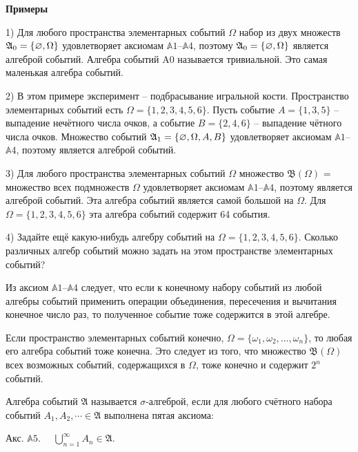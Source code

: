 \textbf{Примеры}

1) Для любого пространства элементарных событий $\Omega$ набор из двух множеств $\mathfrak{A}_0=\{\varnothing,\Omega\}$ удовлетворяет аксиомам $\mathbb{A}1$--$\mathbb{A}4$, поэтому $\mathfrak{A}_0=\{\varnothing,\Omega\}$ является алгеброй событий. Алгебра событий A0 называется тривиальной. Это самая маленькая алгебра событий.

2) В этом примере эксперимент -- подбрасывание игральной кости. Пространство элементарных событий есть $\Omega = \{1, 2, 3, 4, 5, 6\}$. Пусть событие
$A = \{1, 3, 5\}$ -- выпадение нечётного числа очков, а событие $B= \{2, 4, 6\}$
-- выпадение чётного числа очков. 
Множество событий $\mathfrak{A}_1 = \{\varnothing, \Omega, A, B\}$
удовлетворяет аксиомам $\mathbb{A}1$--$\mathbb{A}4$, поэтому является алгеброй событий.

3) Для любого пространства элементарных событий $\Omega$ множество $\mathfrak{B}(\Omega)$ =
множество всех подмножеств $\Omega$ удовлетворяет аксиомам $\mathbb{A}1$--$\mathbb{A}4$, поэтому является алгеброй событий. Эта алгебра событий является самой большой
на $\Omega$. 
Для $\Omega= \{1, 2, 3, 4, 5, 6\}$ эта алгебра событий содержит 64 события.

4) Задайте ещё какую-нибудь алгебру событий на $\Omega = \{1, 2, 3, 4, 5, 6\}$.
Сколько различных алгебр событий можно задать на этом пространстве элементарных событий?

\begin{zam}
Из аксиом $\mathbb{A}1$--$\mathbb{A}4$ следует, что если к конечному набору событий из любой алгебры событий применить операции объединения, пересечения и вычитания конечное число раз, то полученное событие тоже содержится в этой алгебре.
\end{zam}

\begin{zam}
Если пространство элементарных событий конечно,
$\Omega = \{\omega_1,\omega_2,\ldots,\omega_n\}$, то любая его алгебра событий тоже конечна. Это следует из того, что множество $\mathfrak{B}(\Omega)$ всех возможных событий, содержащихся
в $\Omega$, тоже конечно и содержит $2^n$ событий.
\end{zam}

\begin{definition}
 Алгебра событий $\mathfrak{A}$ называется $\sigma$-алгеброй, если для
любого счётного набора событий $A_1,A_2,\cdots \in \mathfrak{A}$ выполнена пятая аксиома:

Акс. $\mathbb{A}5$.$\quad$ $\bigcup\limits_{n=1}^\infty A_n \in\mathfrak{A}$.
\end{definition}


